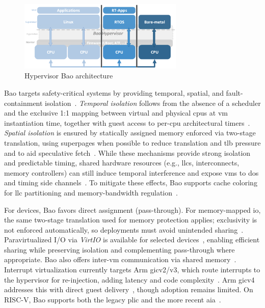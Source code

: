 \begin{figure}[!hbtp]
  \centering
  \includegraphics[width=0.7\textwidth]{./img/png/bao-arch}
  \caption[Hypervisor Bao architecture]{Hypervisor Bao architecture~\cite{martins_et_al:OASIcs:2020:11779}\footnotemark}%
  \label{fig:bao-arch}
\end{figure}
%

Bao targets safety-critical systems by providing temporal, spatial, and
fault-containment isolation~\cite{martins_et_al:OASIcs:2020:11779}. \emph{Temporal isolation}
follows from the absence of a scheduler and the exclusive 1:1 mapping between
virtual and physical \glspl{cpu} at \gls{vm} instantiation time, together with
guest access to per-\gls{cpu} architectural timers~\cite{martins_et_al:OASIcs:2020:11779}.
\emph{Spatial isolation} is ensured by statically assigned memory enforced via
two-stage translation, using superpages when possible to reduce translation and
\gls{tlb} pressure and to aid speculative fetch~\cite{martins_et_al:OASIcs:2020:11779}.
While these mechanisms provide strong isolation and predictable timing,
shared hardware resources (e.g., \glspl{llc}, interconnects, memory
controllers) can still induce temporal interference and expose \glspl{vm} to
\gls{dos} and timing side channels~\cite{bansal2018evaluating,barham2003xen,ge2018survey}.
To mitigate these effects, Bao supports cache coloring for \gls{llc}
partitioning and memory-bandwidth regulation~\cite{martins_et_al:OASIcs:2020:11779}.

For devices, Bao favors direct assignment (pass-through). For memory-mapped
\gls{io}, the same two-stage translation used for memory protection applies;
exclusivity is not enforced automatically, so deployments must avoid unintended
sharing~\cite{martins_et_al:OASIcs:2020:11779}. Paravirtualized I/O via
\emph{VirtIO} is available for selected
devices~\cite{costa2022virtio,ribeiro2023virtio,rocha_mitigating_2023,peixoto-virtio-2024,baoRepo},
enabling efficient sharing while preserving isolation and complementing
pass-through where appropriate. Bao also offers inter-\gls{vm}
communication via shared
memory~\cite{martins_et_al:OASIcs:2020:11779,baoEmbeddedWorld2020}.
%
Interrupt virtualization currently targets Arm \gls{gic}v2/v3, which route
interrupts to the hypervisor for re-injection, adding latency and code
complexity~\cite{martins_et_al:OASIcs:2020:11779}. Arm \gls{gic}v4 addresses
this with direct guest delivery~\cite{arm-gicv4,dall2018design}, though adoption
remains limited. On RISC-V, Bao supports both the legacy \gls{plic} and the more
recent \gls{aia}~\cite{marques_interrupting_2024,baoRepo}.


